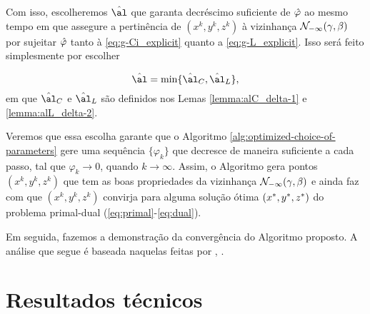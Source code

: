 Com isso, escolheremos  $\hat\al$ que garanta decréscimo suficiente de $\hat{\varphi}$ ao mesmo tempo em que assegure a pertinência de $({x}^{k} ,{y}^{k},{z}^{k})$ à vizinhança $\mathcal{N}_{-\infty}(\gamma,\beta)$ por sujeitar $\hat{\varphi}$ tanto à  \eqref{eq:g-Ci_explicit} quanto a \eqref{eq:g-L_explicit}. Isso será feito simplesmente por escolher

\begin{equation}
	\label{eq:nex-al}
\nextal = \min\{\nextal_{C},\nextal_{L}\},
\end{equation}
em que $\nextal_{C}$ e $\nextal_{L}$ são definidos nos Lemas \ref{lemma:alC_delta-1} e  \ref{lemma:alL_delta-2}.

  




Veremos que essa escolha garante que  o Algoritmo \ref{alg:optimized-choice-of-parameters} gere uma sequência $\{\varphi_k\}$ que decresce de maneira suficiente a cada passo, tal que $\varphi_k \to 0$, quando $k\to \infty$. Assim, o Algoritmo gera pontos $({x}^{k} ,{y}^{k},{z}^{k})$ que tem as boas propriedades da vizinhança $\mathcal{N}_{-\infty}(\gamma,\beta)$ e ainda faz com que $({x}^{k} ,{y}^{k},{z}^{k})$ convirja para  alguma solução ótima $(x^* ,y^*,z^*)$ do problema primal-dual  (\ref{eq:primal}-\ref{eq:dual}).


Em seguida, fazemos a demonstração da convergência do Algoritmo proposto. A análise que segue é  baseada naquelas feitas por \textcite[cap. 6]{Wright:Primal-dual-interior-point:1997h},  \textcite{Zhang:2006ic,Zhang:1995fu}. 



\section{Resultados técnicos}



